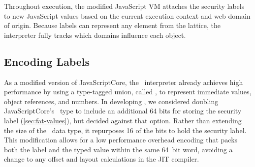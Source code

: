Throughout execution, the modified JavaScript VM attaches the security labels to new JavaScript values based on the current execution context and web domain of origin.
Because labels can represent any element from the lattice, the interpreter fully tracks which domains influence each object.

\subsection{Encoding Labels}\label{sec:jitflow-labelencoding}

As a modified version of JavaScriptCore, the \FlowCore\ interpreter already achieves high performance by using a type-tagged union, called \jsvalue, to represent immediate values, object references, and numbers.
In developing \JitFlow, we considered doubling JavaScriptCore's \jsvalue\ type to include an additional 64 bits for storing the security label (\autoref{sec:fat-values}), but decided against that option.
Rather than extending the size of the \JSValue\ data type, it repurposes 16 of the bits to hold the security label.
This modification allows for a low performance overhead encoding that packs both the label and the typed value within the same 64~bit word, avoiding a change to any offset and layout calculations in the JIT compiler.

